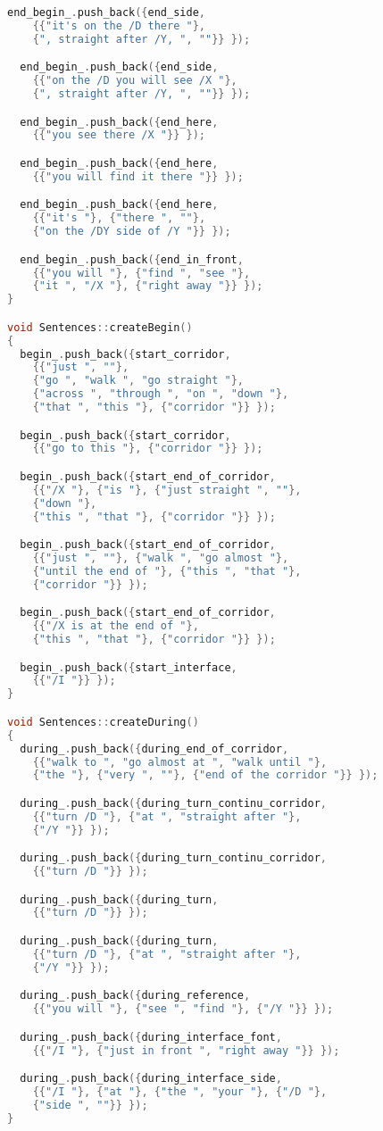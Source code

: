 \begin{lstlisting}[language=C, basicstyle = \footnotesize, showstringspaces=false, stringstyle=\color{purple}]
  end_begin_.push_back({end_side,
    {{"it's on the /D there "}, 
    {", straight after /Y, ", ""}} });

  end_begin_.push_back({end_side,
    {{"on the /D you will see /X "}, 
    {", straight after /Y, ", ""}} });

  end_begin_.push_back({end_here,
    {{"you see there /X "}} });

  end_begin_.push_back({end_here,
    {{"you will find it there "}} });

  end_begin_.push_back({end_here,
    {{"it's "}, {"there ", ""}, 
    {"on the /DY side of /Y "}} });

  end_begin_.push_back({end_in_front,
    {{"you will "}, {"find ", "see "}, 
    {"it ", "/X "}, {"right away "}} });
}

void Sentences::createBegin()
{
  begin_.push_back({start_corridor,
    {{"just ", ""}, 
    {"go ", "walk ", "go straight "},
    {"across ", "through ", "on ", "down "}, 
    {"that ", "this "}, {"corridor "}} });

  begin_.push_back({start_corridor,
    {{"go to this "}, {"corridor "}} });

  begin_.push_back({start_end_of_corridor,
    {{"/X "}, {"is "}, {"just straight ", ""}, 
    {"down "}, 
    {"this ", "that "}, {"corridor "}} });

  begin_.push_back({start_end_of_corridor,
    {{"just ", ""}, {"walk ", "go almost "}, 
    {"until the end of "}, {"this ", "that "}, 
    {"corridor "}} });

  begin_.push_back({start_end_of_corridor,
    {{"/X is at the end of "}, 
    {"this ", "that "}, {"corridor "}} });

  begin_.push_back({start_interface,
    {{"/I "}} });
}

void Sentences::createDuring()
{
  during_.push_back({during_end_of_corridor,
    {{"walk to ", "go almost at ", "walk until "}, 
    {"the "}, {"very ", ""}, {"end of the corridor "}} });

  during_.push_back({during_turn_continu_corridor,
    {{"turn /D "}, {"at ", "straight after "}, 
    {"/Y "}} });

  during_.push_back({during_turn_continu_corridor,
    {{"turn /D "}} });

  during_.push_back({during_turn,
    {{"turn /D "}} });

  during_.push_back({during_turn,
    {{"turn /D "}, {"at ", "straight after "}, 
    {"/Y "}} });

  during_.push_back({during_reference,
    {{"you will "}, {"see ", "find "}, {"/Y "}} });

  during_.push_back({during_interface_font,
    {{"/I "}, {"just in front ", "right away "}} });

  during_.push_back({during_interface_side,
    {{"/I "}, {"at "}, {"the ", "your "}, {"/D "}, 
    {"side ", ""}} });
}
\end{lstlisting}

